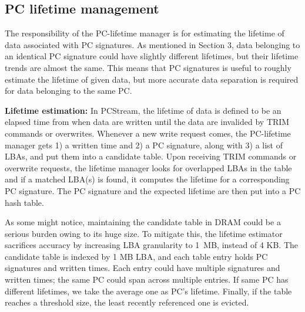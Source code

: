 

\subsection{PC lifetime management}
The responsibility of the PC-lifetime manager is for estimating the lifetime of
data associated with PC signatures. As mentioned in Section
3, data belonging to an identical PC signature could have
slightly different lifetimes, but their lifetime trends are almost the same.
This means that PC signatures is useful to roughly estimate the lifetime of
given data, but more accurate data separation is required for data belonging to
the same PC.  

\textbf{Lifetime estimation:}
In \textsf{PCStream}, the lifetime of data is defined to be an elapsed time
from when data are written until the data are invalided by TRIM commands or
overwrites. Whenever a new write request comes, the PC-lifetime manager gets 1)
a written time and 2) a PC signature, along with 3) a list of LBAs, and put
them into a candidate table. Upon receiving TRIM commands or overwrite
requests, the lifetime manager looks for overlapped LBAs in
the table and if a matched LBA(s) is found, it computes the lifetime
for a corresponding PC signature. The PC signature and the expected lifetime
are then put into a PC hash table.

As some might notice, maintaining the candidate table in DRAM could be a
serious burden owing to its huge size. To mitigate this, the lifetime estimator
sacrifices accuracy by increasing LBA granularity to 1~MB, instead of 4 KB.
The candidate table is indexed by 1 MB LBA, and each table entry holds PC
signatures and written times. Each entry could have multiple signatures and
written times; the same PC could span across multiple entries.  If same PC has
different lifetimes, we take the average one as PC's lifetime. Finally, if the
table reaches a threshold size, the least recently referenced one is evicted. 

